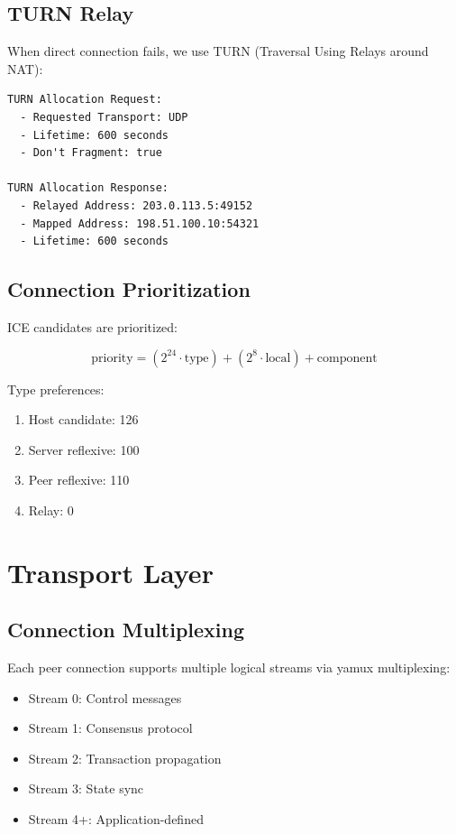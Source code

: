 \documentclass[11pt,a4paper]{article}
\begin{document}
\subsection{TURN Relay}

When direct connection fails, we use TURN (Traversal Using Relays around NAT):

\begin{lstlisting}
TURN Allocation Request:
  - Requested Transport: UDP
  - Lifetime: 600 seconds
  - Don't Fragment: true

TURN Allocation Response:
  - Relayed Address: 203.0.113.5:49152
  - Mapped Address: 198.51.100.10:54321
  - Lifetime: 600 seconds
\end{lstlisting}

\subsection{Connection Prioritization}

ICE candidates are prioritized:

\[
\text{priority} = (2^{24} \cdot \text{type}) + (2^{8} \cdot \text{local}) + \text{component}
\]

Type preferences:
\begin{enumerate}
    \item Host candidate: 126
    \item Server reflexive: 100
    \item Peer reflexive: 110
    \item Relay: 0
\end{enumerate}

\section{Transport Layer}

\subsection{Connection Multiplexing}

Each peer connection supports multiple logical streams via yamux multiplexing:

\begin{itemize}
    \item Stream 0: Control messages
    \item Stream 1: Consensus protocol
    \item Stream 2: Transaction propagation
    \item Stream 3: State sync
    \item Stream 4+: Application-defined
\end{itemize}
\end{document}
